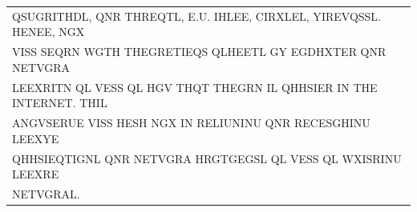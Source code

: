 \documentclass[aspectratio=169, lualatex, handout, 10pt,dvipsnames,svgnames]{beamer} %
\def\enbleu#1{\textcolor{bleu}{#1}}
\begin{document}
\begin{frame}
{\begin{tabular}[t]{l}
      QSUG\enbleu{R}\enbleu{I}\enbleu{T}\enbleu{H}DL, Q\enbleu{N}R \enbleu{T}\enbleu{H}\enbleu{R}\enbleu{E}Q\enbleu{T}L, \enbleu{E}.U. \enbleu{I}HL\enbleu{E}E, C\enbleu{I}\enbleu{R}XL\enbleu{E}L, Y\enbleu{I}\enbleu{R}\enbleu{E}VQSSL. \enbleu{H}\enbleu{E}\enbleu{N}E\enbleu{E}, NGX \\
      V\enbleu{I}SS S\enbleu{E}Q\enbleu{R}\enbleu{N} WG\enbleu{T}\enbleu{H} \enbleu{T}\enbleu{H}\enbleu{E}G\enbleu{R}\enbleu{E}\enbleu{T}\enbleu{I}EQS QLH\enbleu{E}E\enbleu{T}L GY EGDHX\enbleu{T}\enbleu{E}\enbleu{R} Q\enbleu{N}R \enbleu{N}\enbleu{E}\enbleu{T}VG\enbleu{R}A \\
      L\enbleu{E}EX\enbleu{R}\enbleu{I}\enbleu{T}N QL V\enbleu{E}SS QL \enbleu{H}GV \enbleu{T}\enbleu{H}Q\enbleu{T} \enbleu{T}\enbleu{H}\enbleu{E}G\enbleu{R}N \enbleu{I}L QHHS\enbleu{I}\enbleu{E}R \enbleu{I}\enbleu{N} \enbleu{T}\enbleu{H}\enbleu{E} \enbleu{I}\enbleu{N}\enbleu{T}\enbleu{E}\enbleu{R}\enbleu{N}\enbleu{E}\enbleu{T}. \enbleu{T}\enbleu{H}\enbleu{I}L \\
      A\enbleu{N}GVS\enbleu{E}RU\enbleu{E} V\enbleu{I}SS \enbleu{H}\enbleu{E}SH NGX \enbleu{I}\enbleu{N} R\enbleu{E}L\enbleu{I}U\enbleu{N}\enbleu{I}\enbleu{N}U Q\enbleu{N}R R\enbleu{E}C\enbleu{E}SGH\enbleu{I}\enbleu{N}U L\enbleu{E}EXY\enbleu{E} \\
      QHHS\enbleu{I}EQ\enbleu{T}\enbleu{I}G\enbleu{N}L Q\enbleu{N}R \enbleu{N}\enbleu{E}\enbleu{T}VG\enbleu{R}A H\enbleu{R}G\enbleu{T}GEGSL QL V\enbleu{E}SS QL WX\enbleu{I}SR\enbleu{I}\enbleu{N}U L\enbleu{E}EX\enbleu{R}\enbleu{E} \\
      \enbleu{N}\enbleu{E}\enbleu{T}VG\enbleu{R}AL.
    \end{tabular}
  }
  \vspace{0.5cm}

  \normalsize
  
  \color{black}
\end{frame}
\end{document}
